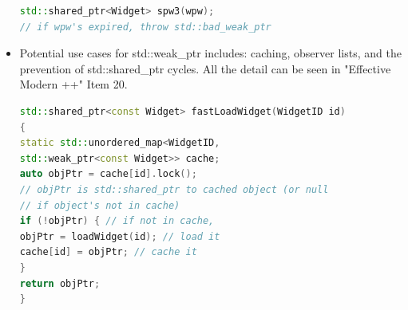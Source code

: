 \documentclass[a4paper,12pt,twoside]{book}
\begin{document}
\begin{itemize}
\begin{lstlisting}[frame=single, language=c++,mathescape=true]
std::shared_ptr<Widget> spw3(wpw);
// if wpw's expired, throw std::bad_weak_ptr
\end{lstlisting}



\item Potential use cases for std::weak\_ptr includes: caching, observer lists, and the prevention of std::shared\_ptr cycles.  All the detail can be seen in "Effective Modern ++" Item 20.
\begin{lstlisting}[frame=single, language=c++]
std::shared_ptr<const Widget> fastLoadWidget(WidgetID id)
{
static std::unordered_map<WidgetID,
std::weak_ptr<const Widget>> cache;
auto objPtr = cache[id].lock();
// objPtr is std::shared_ptr to cached object (or null
// if object's not in cache)
if (!objPtr) { // if not in cache,
objPtr = loadWidget(id); // load it
cache[id] = objPtr; // cache it
}
return objPtr;
}
\end{lstlisting}


\end{itemize}
\end{document}
